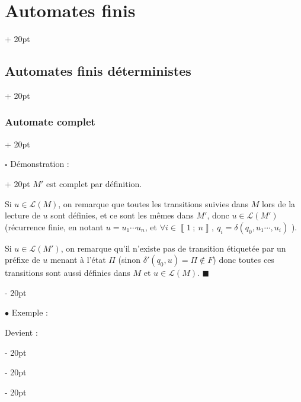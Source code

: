 \documentclass[a4paper, 12pt, twoside]{article}
\newcommand{\nset}[2]{\left\llbracket #1\ ;\ #2 \right\rrbracket}
\newcommand{\ind}[1][20pt]{\advance\leftskip + #1}
\newcommand{\deind}[1][20pt]{\advance\leftskip - #1}
\newenvironment{indt}[2][20pt]{#2 \par \ind[#1]}{\par \deind} %
\newenvironment{proof}[1][{Démonstration :}]{\begin{indt}{$\square$ #1}}{$\blacksquare$ \end{indt}}
\begin{document}
\begin{indt}{\section{Automates finis}}
\begin{indt}{\subsection{Automates finis déterministes}}
\begin{indt}{\subsubsection{Automate complet}}
                \vspace{6pt}
                
                \begin{proof}
                    $M'$ est complet par définition.

                    Si $u \in \mathcal L(M)$, on remarque que toutes les transitions suivies dans $M$ lors de la lecture de $u$ sont définies, et ce sont les mêmes dans $M'$, donc $u \in \mathcal L(M')$ (récurrence finie, en notant $u = u_1 \cdots u_n$, et $\forall i \in \nset 1 n,\ q_i = \delta(q_0, u_1 \cdots, u_i)$ ).

                    \vspace{6pt}
                    
                    Si $u \in \mathcal L(M')$, on remarque qu'il n'existe pas de transition étiquetée par un préfixe de $u$ menant à l'état $\Pi$ (sinon $\delta'(q_0, u) = \Pi \notin F$) donc toutes ces transitions sont aussi définies dans $M$ et $u \in \mathcal L(M)$.
                \end{proof}

                \vspace{12pt}
                
                $\bullet$ Exemple :

                \begin{center}
                \end{center}

                Devient :
                \begin{center}
\end{center}
\end{indt}
\end{indt}
\end{indt}
\end{document}
